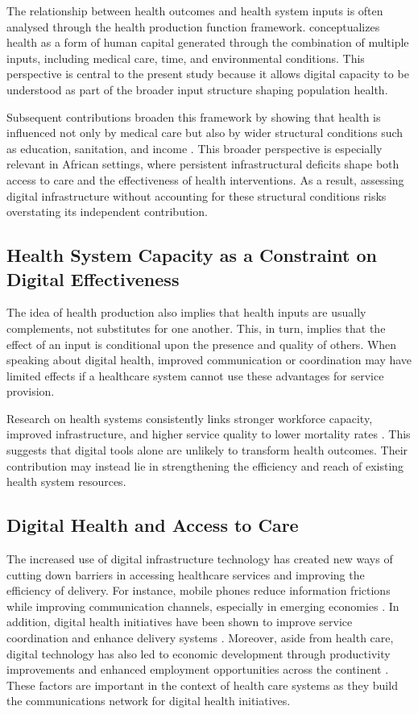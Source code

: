 \documentclass[12pt]{article}
\begin{document}
The relationship between health outcomes and health system inputs is often analysed through the health production function framework. \citet{grossman1972} conceptualizes health as a form of human capital generated through the combination of multiple inputs, including medical care, time, and environmental conditions. This perspective is central to the present study because it allows digital capacity to be understood as part of the broader input structure shaping population health.

\medskip
Subsequent contributions broaden this framework by showing that health is influenced not only by medical care but also by wider structural conditions such as education, sanitation, and income \citep{cutler2006}. This broader perspective is especially relevant in African settings, where persistent infrastructural deficits shape both access to care and the effectiveness of health interventions. As a result, assessing digital infrastructure without accounting for these structural conditions risks overstating its independent contribution.

\subsection{Health System Capacity as a Constraint on Digital Effectiveness}

The idea of health production also implies that health inputs are usually complements, not substitutes for one another. This, in turn, implies that the effect of an input is conditional upon the presence and quality of others. When speaking about digital health, improved communication or coordination may have limited effects if a healthcare system cannot use these advantages for service provision.

\medskip
Research on health systems consistently links stronger workforce capacity, improved infrastructure, and higher service quality to lower mortality rates \citep{who2007,kruk2018}. This suggests that digital tools alone are unlikely to transform health outcomes. Their contribution may instead lie in strengthening the efficiency and reach of existing health system resources.

\subsection{Digital Health and Access to Care}

The increased use of digital infrastructure technology has created new ways of cutting down barriers in accessing healthcare services and improving the efficiency of delivery. For instance, mobile phones reduce information frictions while improving communication channels, especially in emerging economies \citep{aker2010}. In addition, digital health initiatives have been shown to improve service coordination and enhance delivery systems \citep{labrique2013}. Moreover, aside from health care, digital technology has also led to economic development through productivity improvements and enhanced employment opportunities across the continent \citep{hjort2019}. These factors are important in the context of health care systems as they build the communications network for digital health initiatives.
\end{document}
